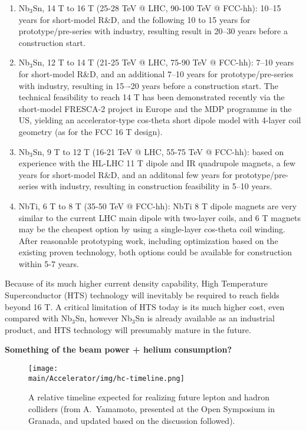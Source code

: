 \begin{enumerate}

\item 
    Nb$_3$Sn, 14 T to 16 T (25-28 TeV @ LHC, 90-100 TeV @ FCC-hh):  10--15 years for short-model R\&D, and the following 10 to 15 years for prototype/pre-series with industry, resulting  result in 20–30 years before a construction  start.

\item Nb$_3$Sn, 12 T to 14 T (21-25 TeV @ LHC, 75-90 TeV @ FCC-hh):  7--10 years for short-model R\&D, and an additional 7--10 years for prototype/pre-series with industry, resulting in 15–-20 years before a construction start. The technical feasibility to reach 14 T has been demonstrated recently via the short-model FRESCA-2 project in Europe and the MDP programme in the US, yielding an accelerator-type cos-theta short dipole model with 4-layer coil geometry (as for the FCC 16 T design).

\item Nb$_3$Sn, 9 T to 12 T (16-21 TeV @ LHC, 55-75 TeV @ FCC-hh): based on experience with the HL-LHC 11 T dipole and IR quadrupole magnets, a few years for short-model R\&D, and an additonal few years for prototype/pre-series with industry, resulting in construction feasibility in 5--10 years.

\item  NbTi, 6 T to 8 T (35-50 TeV @ FCC-hh): NbTi 8 T dipole magnets are very similar to the current LHC main dipole with two-layer coils, and 6 T magnets may be the cheapest option by using a single-layer cos-theta coil winding. After reasonable prototyping work, including optimization based on the existing proven technology, both options could be available for construction within 5-7 years. 
\end{enumerate}

Because of its much higher current density capability, High Temperature Superconductor (HTS) technology will inevitably be required to reach fields beyond 16 T. A critical limitation of HTS today is its much higher cost, even compared with Nb$_3$Sn, however Nb$_3$Sn is already available as an industrial product, and HTS technology will presumably mature in the future.

{\bf Something of the beam power + helium consumption?}

 \begin{figure}[ht]
 \centering
 \texttt{[image: \\main/Accelerator/img/hc-timeline.png]}
\caption{ A relative timeline expected for realizing future lepton and hadron colliders (from A.~Yamamoto, presented at the Open Symposium in Granada, and updated based on the discussion followed).}
\label{fig:hctl}
\end{figure}

